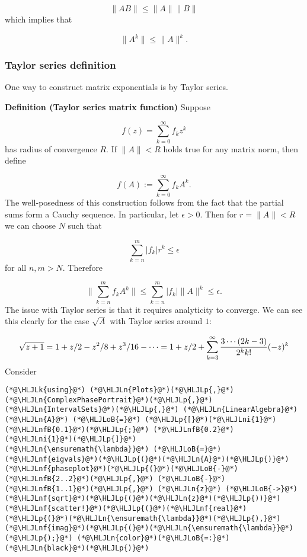 \documentclass[12pt,a4paper]{article}
\newcommand{\HLJLk}[1]{\textcolor[RGB]{148,91,176}{\textbf{#1}}}
\newcommand{\HLJLn}[1]{#1}
\newcommand{\HLJLnf}[1]{\textcolor[RGB]{66,102,213}{#1}}
\newcommand{\HLJLnfB}[1]{\textcolor[RGB]{59,151,46}{#1}}
\newcommand{\HLJLni}[1]{\textcolor[RGB]{59,151,46}{#1}}
\newcommand{\HLJLoB}[1]{\textcolor[RGB]{102,102,102}{\textbf{#1}}}
\newcommand{\HLJLp}[1]{#1}
\begin{document}
\[
\|A B\| \leq \|A \| \|B \|
\]
which implies that

\[
\|A^k \| \leq \|A\|^k.
\]
\subsubsection{Taylor series definition}
One way to construct matrix exponentials is by Taylor series.

\textbf{Definition (Taylor series matrix function)} Suppose

\[
f(z) = \sum_{k=0}^\infty f_k z^k
\]
has radius of convergence $R$. If $\|A \| < R$ holds true for any matrix norm, then define

\[
f(A) := \sum_{k=0}^\infty f_k A^k.
\]
The well-posedness of this construction follows from the fact that the partial sums form a Cauchy sequence. In particular, let $\epsilon > 0$. Then for $r = \|A \| < R$ we can choose $N$ such that

\[
\sum_{k=n}^m |f_k| r^k \leq \epsilon
\]
for all $n,m > N$. Therefore

\[
\|\sum_{k=n}^m f_k A^k \| \leq \sum_{k=n}^m |f_k| \|A\|^k \leq \epsilon.
\]
The issue with Taylor series is that it requires analyticity to converge. We can see this clearly for the case $\sqrt{A}$ with Taylor series around $1$:

\[
\sqrt{z+1} = 1 + z/2 - z^2/8 + z^3/16 - \cdots = 1 + z/2 + \sum_{k=3}^\infty {3 \cdots (2k-3) \over 2^k k!} (-z)^k
\]
Consider


\begin{lstlisting}
(*@\HLJLk{using}@*) (*@\HLJLn{Plots}@*)(*@\HLJLp{,}@*) (*@\HLJLn{ComplexPhasePortrait}@*)(*@\HLJLp{,}@*) (*@\HLJLn{IntervalSets}@*)(*@\HLJLp{,}@*) (*@\HLJLn{LinearAlgebra}@*)
(*@\HLJLn{A}@*) (*@\HLJLoB{=}@*) (*@\HLJLp{[}@*)(*@\HLJLni{1}@*) (*@\HLJLnfB{0.1}@*)(*@\HLJLp{;}@*) (*@\HLJLnfB{0.2}@*) (*@\HLJLni{1}@*)(*@\HLJLp{]}@*)
(*@\HLJLn{\ensuremath{\lambda}}@*) (*@\HLJLoB{=}@*) (*@\HLJLnf{eigvals}@*)(*@\HLJLp{(}@*)(*@\HLJLn{A}@*)(*@\HLJLp{)}@*)
(*@\HLJLnf{phaseplot}@*)(*@\HLJLp{(}@*)(*@\HLJLoB{-}@*)(*@\HLJLnfB{2..2}@*)(*@\HLJLp{,}@*) (*@\HLJLoB{-}@*)(*@\HLJLnfB{1..1}@*)(*@\HLJLp{,}@*) (*@\HLJLn{z}@*) (*@\HLJLoB{->}@*) (*@\HLJLnf{sqrt}@*)(*@\HLJLp{(}@*)(*@\HLJLn{z}@*)(*@\HLJLp{))}@*)
(*@\HLJLnf{scatter!}@*)(*@\HLJLp{(}@*)(*@\HLJLnf{real}@*)(*@\HLJLp{(}@*)(*@\HLJLn{\ensuremath{\lambda}}@*)(*@\HLJLp{),}@*)(*@\HLJLnf{imag}@*)(*@\HLJLp{(}@*)(*@\HLJLn{\ensuremath{\lambda}}@*)(*@\HLJLp{);}@*) (*@\HLJLn{color}@*)(*@\HLJLoB{=:}@*)(*@\HLJLn{black}@*)(*@\HLJLp{)}@*)
\end{lstlisting}
\end{document}
